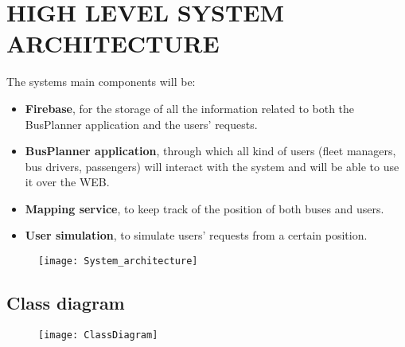 \section{HIGH LEVEL SYSTEM ARCHITECTURE}
The system\textquotesingle s main components will be:
\begin{itemize}
	\item \textbf{Firebase}, for the storage of all the information related to both the BusPlanner application and the users' requests.
	\item \textbf{BusPlanner application}, through which all kind of users (fleet managers, bus drivers, passengers) will interact with the system and will be able to use it over the WEB.
	\item \textbf{Mapping service}, to keep track of the position of both buses and users.  
	\item \textbf{User simulation}, to simulate users' requests from a certain position.
\end{itemize}
\begin{figure}[H]
	\centering
	\texttt{[image: System\_architecture]}
\end{figure}
\subsection{Class diagram}
\begin{figure}[H]
	\centering
	\texttt{[image: ClassDiagram]}
\end{figure}